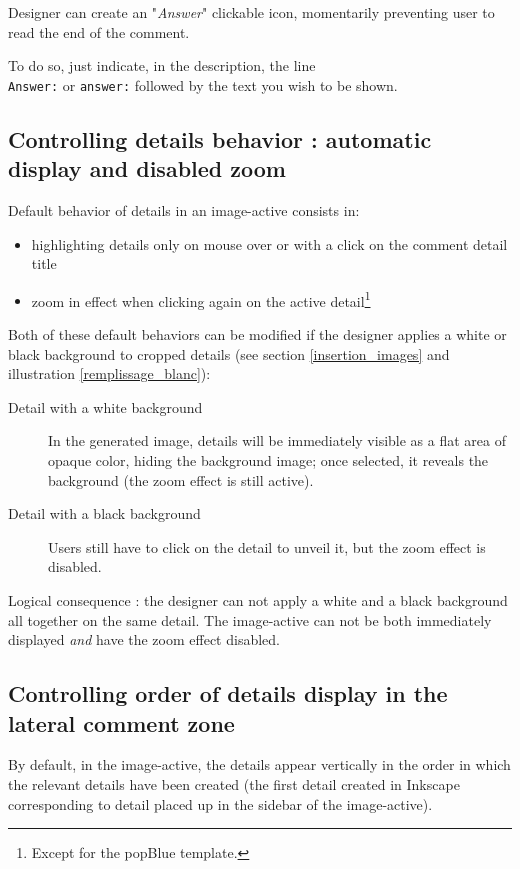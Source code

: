 Designer can create an "\textit{Answer}" clickable icon, momentarily 
preventing user to read the end of the comment.

To do so, just indicate, in the description, the line\\ \verb|Answer:| or 
\verb|answer:| followed by the text you wish to be shown.

\subsection{Controlling details behavior : automatic display and disabled zoom}\label{white_black_background}
\label{couche_XML}

Default behavior of details in an image-active consists in:
\begin{itemize}
 \item highlighting details only on mouse over or with a click on the comment 
 detail title
 \item zoom in effect when clicking again on the active detail\footnote{Except 
 for the popBlue template.}
\end{itemize}

Both of these default behaviors can be modified if the designer applies a white
 or black background to cropped details (see section 
\ref{insertion_images} 
 and illustration 
\ref{remplissage_blanc}):
\begin{description}
 \item [Detail with a white background] In the generated image, details will be
 immediately visible as a flat area of opaque color, hiding the background image;  
 once selected, it reveals the background (the zoom effect is still active).
 \item [Detail with a black background] Users still have to click on the detail to unveil it, but the zoom effect is disabled.
\end{description}

Logical consequence : the designer can not apply a white and a black
background all together on the same detail. The image-active can not be 
both immediately displayed \textit{and} have the zoom effect disabled.

\subsection{Controlling order of details display in the lateral comment zone}

By default, in the image-active, the details appear vertically in the order in which the relevant details have been created (the first detail created in Inkscape corresponding to detail placed up in the sidebar of the image-active).

